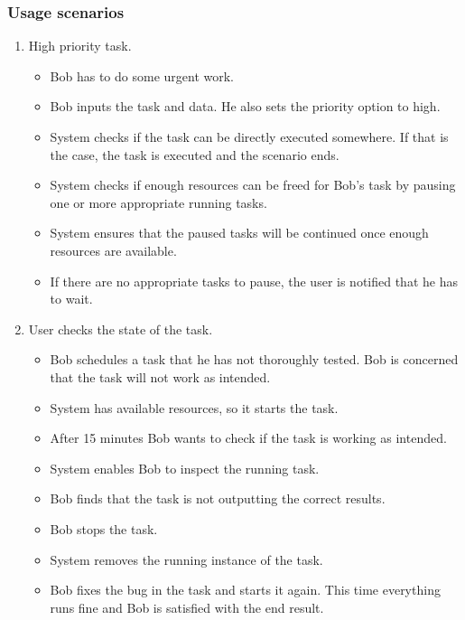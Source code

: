 \subsubsection{Usage scenarios}
\begin{enumerate}
  \item High priority task.
  \begin{itemize}
    \item Bob has to do some urgent work.
    \item Bob inputs the task and data. He also sets the priority option to high.
    \item System checks if the task can be directly executed somewhere.
    If that is the case, the task is executed and the scenario ends.
    \item System checks if enough resources can be freed for Bob's task by pausing one or more appropriate running tasks.
    \item System ensures that the paused tasks will be continued once enough resources are available.
    \item If there are no appropriate tasks to pause, the user is notified that he has to wait.
  \end{itemize}
  \item User checks the state of the task.
  \begin{itemize}
    \item Bob schedules a task that he has not thoroughly tested.
    Bob is concerned that the task will not work as intended.
    \item System has available resources, so it starts the task.
    \item After 15 minutes Bob wants to check if the task is working as intended.
    \item System enables Bob to inspect the running task.
    \item Bob finds that the task is not outputting the correct results.
    \item Bob stops the task.
    \item System removes the running instance of the task.
    \item Bob fixes the bug in the task and starts it again.
    This time everything runs fine and Bob is satisfied with the end result.
  \end{itemize}
\end{enumerate}
